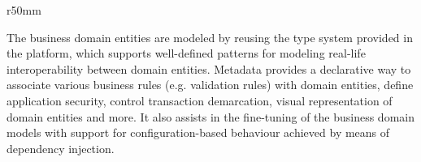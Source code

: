   \begin{wrapfigure}{r}{50mm}
    \vspace{-20pt}
    \centering   
    \vspace{-10pt}
  \end{wrapfigure}

  The business domain entities are modeled by reusing the type system provided in the platform, which supports well-defined patterns for modeling real-life interoperability between domain entities.  
  Metadata provides a declarative way to associate various business rules (e.g. validation rules) with domain entities, define application security, control transaction demarcation, visual representation of domain entities and more.
  It also assists in the fine-tuning of the business domain models with support for configuration-based behaviour achieved by means of dependency injection.


